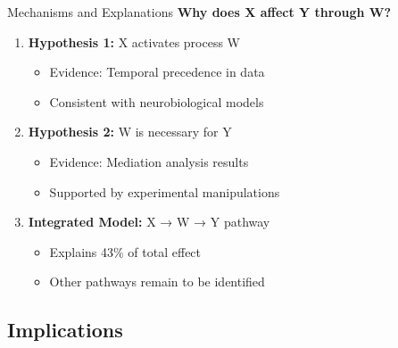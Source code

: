 \documentclass[aspectratio=169,11pt]{beamer}
\begin{document}
\begin{frame}{Mechanisms and Explanations}
  \textbf{Why does X affect Y through W?}
  
  \vspace{0.3cm}
  
  \begin{enumerate}
    \item<1-> \textbf{Hypothesis 1:} X activates process W
    \begin{itemize}
      \item<1-> Evidence: Temporal precedence in data
      \item<1-> Consistent with neurobiological models
    \end{itemize}
    
    \vspace{0.3cm}
    
    \item<2-> \textbf{Hypothesis 2:} W is necessary for Y
    \begin{itemize}
      \item<2-> Evidence: Mediation analysis results
      \item<2-> Supported by experimental manipulations
    \end{itemize}
    
    \vspace{0.3cm}
    
    \item<3-> \textbf{Integrated Model:} X → W → Y pathway
    \begin{itemize}
      \item<3-> Explains 43\% of total effect
      \item<3-> Other pathways remain to be identified
    \end{itemize}
  \end{enumerate}
\end{frame}

\subsection{Implications}
\end{document}
